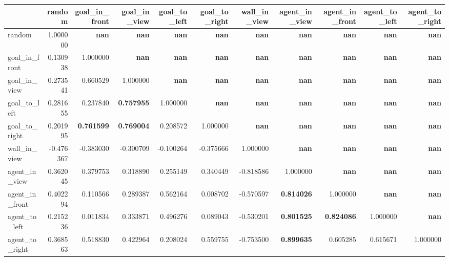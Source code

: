 \begin{tabular}{lrrrrrrrrrr}
\toprule
 & random & goal\_in\_front & goal\_in\_view & goal\_to\_left & goal\_to\_right & wall\_in\_view & agent\_in\_view & agent\_in\_front & agent\_to\_left & agent\_to\_right \\
\midrule
random & 1.000000 & \color{f_white} \bfseries nan & \color{f_white} \bfseries nan & \color{f_white} \bfseries nan & \color{f_white} \bfseries nan & \color{f_white} \bfseries nan & \color{f_white} \bfseries nan & \color{f_white} \bfseries nan & \color{f_white} \bfseries nan & \color{f_white} \bfseries nan \\
goal\_in\_front & 0.130938 & 1.000000 & \color{f_white} \bfseries nan & \color{f_white} \bfseries nan & \color{f_white} \bfseries nan & \color{f_white} \bfseries nan & \color{f_white} \bfseries nan & \color{f_white} \bfseries nan & \color{f_white} \bfseries nan & \color{f_white} \bfseries nan \\
goal\_in\_view & 0.273541 & 0.660529 & 1.000000 & \color{f_white} \bfseries nan & \color{f_white} \bfseries nan & \color{f_white} \bfseries nan & \color{f_white} \bfseries nan & \color{f_white} \bfseries nan & \color{f_white} \bfseries nan & \color{f_white} \bfseries nan \\
goal\_to\_left & 0.281655 & 0.237840 & \color{f_green} \bfseries 0.757955 & 1.000000 & \color{f_white} \bfseries nan & \color{f_white} \bfseries nan & \color{f_white} \bfseries nan & \color{f_white} \bfseries nan & \color{f_white} \bfseries nan & \color{f_white} \bfseries nan \\
goal\_to\_right & 0.201995 & \color{f_green} \bfseries 0.761599 & \color{f_green} \bfseries 0.769004 & 0.208572 & 1.000000 & \color{f_white} \bfseries nan & \color{f_white} \bfseries nan & \color{f_white} \bfseries nan & \color{f_white} \bfseries nan & \color{f_white} \bfseries nan \\
wall\_in\_view & -0.476367 & -0.383030 & -0.300709 & -0.100264 & -0.375666 & 1.000000 & \color{f_white} \bfseries nan & \color{f_white} \bfseries nan & \color{f_white} \bfseries nan & \color{f_white} \bfseries nan \\
agent\_in\_view & 0.362045 & 0.379753 & 0.318890 & 0.255149 & 0.340449 & -0.818586 & 1.000000 & \color{f_white} \bfseries nan & \color{f_white} \bfseries nan & \color{f_white} \bfseries nan \\
agent\_in\_front & 0.402294 & 0.110566 & 0.289387 & 0.562164 & 0.008702 & -0.570597 & \color{f_green} \bfseries 0.814026 & 1.000000 & \color{f_white} \bfseries nan & \color{f_white} \bfseries nan \\
agent\_to\_left & 0.215236 & 0.011834 & 0.333871 & 0.496276 & 0.089043 & -0.530201 & \color{f_green} \bfseries 0.801525 & \color{f_green} \bfseries 0.824086 & 1.000000 & \color{f_white} \bfseries nan \\
agent\_to\_right & 0.368563 & 0.518830 & 0.422964 & 0.208024 & 0.559755 & -0.753500 & \color{f_green} \bfseries 0.899635 & 0.605285 & 0.615671 & 1.000000 \\
\bottomrule
\end{tabular}
